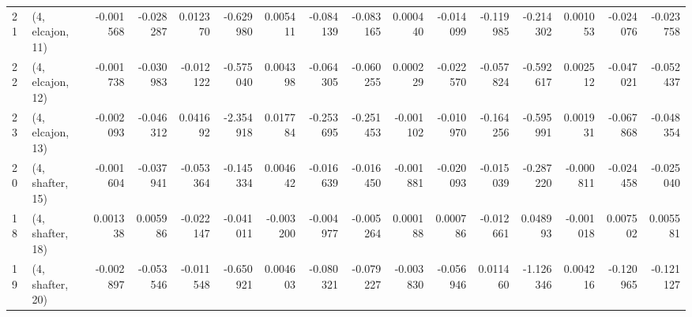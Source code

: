 \begin{tabular}{llrrrrrrrrrrrrrr}
21 &  (4, elcajon, 11) &  -0.001568 & -0.028287 &  0.012370 &  -0.629980 &  0.005411 &  -0.084139 & -0.083165 &  0.000440 & -0.014099 & -0.119985 &  -0.214302 &  0.001053 & -0.024076 & -0.023758 \\
22 &  (4, elcajon, 12) &  -0.001738 & -0.030983 & -0.012122 &  -0.575040 &  0.004398 &  -0.064305 & -0.060255 &  0.000229 & -0.022570 & -0.057824 &  -0.592617 &  0.002512 & -0.047021 & -0.052437 \\
23 &  (4, elcajon, 13) &  -0.002093 & -0.046312 &  0.041692 &  -2.354918 &  0.017784 &  -0.253695 & -0.251453 & -0.001102 & -0.010970 & -0.164256 &  -0.595991 &  0.001931 & -0.067868 & -0.048354 \\
20 &  (4, shafter, 15) &  -0.001604 & -0.037941 & -0.053364 &  -0.145334 &  0.004642 &  -0.016639 & -0.016450 & -0.001881 & -0.020093 & -0.015039 &  -0.287220 & -0.000811 & -0.024458 & -0.025040 \\
18 &  (4, shafter, 18) &   0.001338 &  0.005986 & -0.022147 &  -0.041011 & -0.003200 &  -0.004977 & -0.005264 &  0.000188 &  0.000786 & -0.012661 &   0.048993 & -0.001018 &  0.007502 &  0.005581 \\
19 &  (4, shafter, 20) &  -0.002897 & -0.053546 & -0.011548 &  -0.650921 &  0.004603 &  -0.080321 & -0.079227 & -0.003830 & -0.056946 &  0.011460 &  -1.126346 &  0.004216 & -0.120965 & -0.121127 \\
\bottomrule
\end{tabular}
